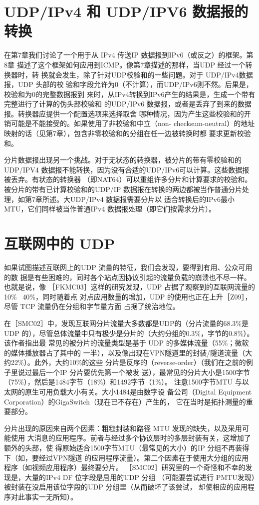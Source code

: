 \section{UDP/IPv4 和 UDP/IPV6 数据报的转换}
在第7章我们讨论了一个用于从 IPv4 传送IP 数据报到IPv6（或反之）的框架。第8章
描述了这个框架如何应用到ICMP。像第7章描述的那样，当UDP 经过一个转换器时，转
换就会发生，除了针对UDP校验和的一些问题。对于 UDP/IPv4数据报，UDP 头部的校
验和字段允许为0（不计算），而UDP/IPv6则不然。后果是，校验和为0的完整数据报到
来时，从IPv4转换到IPv6产生的结果是，生成一个带有完整进行了计算的伪头部校验和
的UDP/IPv6 数据报，或者是丢弃了到来的数据报。转换器应提供一个配置选项来选择取舍
哪种情况，因为产生这些校验和的开销可能是不能接受的。如果使用了非校验和中立（non-
checksum-neutral）的地址映射的话（见第7章），包含非零校验和的分组在任一边被转换时都
要求更新校验和。

分片数据报出现另一个挑战。对于无状态的转换器，被分片的带有零校验和的 UDP/IPV4
数据报不能转换，因为没有合适的UDP/IPv6可以计算。这些数据报被丢弃。有状态的转换器
（即NAT64）可以重组许多分片和计算要求的校验和。被分片的带有已计算校验和的UDP/IP
数据报在转换的两边都被当作普通分片处理，如第7章所述。大UDP/IPv4 数据报需要分片以
适合转换后的IPv6最小MTU，它们同样被当作普通IPv4 数据报处理（即它们按需求分片）。

\section{互联网中的 UDP}
如果试图描述互联网上的UDP 流量的特征，我们会发现，要得到有用、公众可用的数
据是有些困难的，同时各个站点因协议引起的流量负载的崩溃也不尽一样。也就是说，像
［FKMC03］这样的研究发现，UDP 占据了观察到的互联网流量的10\% ~40\%，同时随着点
对点应用数量的增加，UDP 的使用也正在上升［Z09］，尽管 TCP 流量仍在分组和字节量方面
占据了统治地位。

在［SMC02］中，发现互联网分片流量大多数都是UDP的（分片流量的68.3\%是UDP
的），尽管总体流量中只有极少是分片的（大约分组的0.3\%，字节的0.8\%）。该作者指出最
常见的被分片的流量类型是基于 UDP 的多媒体流量（55\%；微软的媒体播放器占了其中的
一半），以及像出现在VPN隧道里的封装/隧道流量（大约22\%）。此外，大约10\%的这些
分片是反序的（reverse-order）（我们在之前的例子里说过最后一个IP 分片要优先第一个被发
送），最常见的分片大小是1500字节（75\%），然后是1484字节（18\%）和1492字节（1\%）。
注意1500字节MTU 与以太网的原生可用负载大小有关。大小1484是由数字设
备公司（Digital Equipment Corporation）的GigaSwitch（现在已不存在）产生的，
它在当时是拓扑测量的重要部分。

分片出现的原因来自两个因素：粗糙封装和路径 MTU 发现的缺失，以及采用可能使用
大消息的应用程序。前者与经过多个协议层时的多层封装有关，这增加了额外的头部，使
得原始适合1500字节MTU（最常见的大小）的IP 分组不再装得下（如，要经过VPN隧道
的应用程序流量）。第二个因素在于使用大分组的应用程序（如视频应用程序）最终要分片。
［SMC02］研究里的一个奇怪和不幸的发现是，大量的IPv4 DF 位字段是启用的UDP 分组
（可能要尝试进行 PMTU发现）被封装在没启用该位字段的UDP 分组里（从而破坏了该尝试，
却使相应的应用程序对此事实一无所知）。

